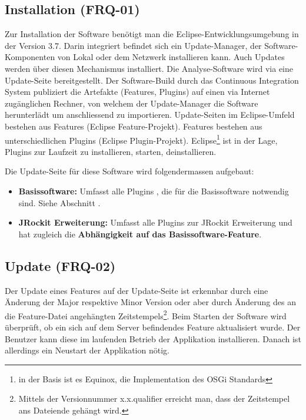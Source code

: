 \subsection{Installation (FRQ-01)}\label{installation}
Zur Installation der Software benötigt man die Eclipse-Entwicklungsumgebung in der Version 3.7. Darin integriert befindet sich ein Update-Manager, der Software-Komponenten von Lokal oder dem Netzwerk installieren kann. Auch Updates werden über diesen Mechanismus installiert. Die Analyse-Software wird via eine Update-Seite bereitgestellt. Der Software-Build durch das Continuous Integration System publiziert die Artefakte (Features, Plugins) auf einen via Internet zugänglichen Rechner, von welchem der Update-Manager die Software herunterlädt um anschliessend zu importieren. Update-Seiten im Eclipse-Umfeld bestehen aus Features (Eclipse Feature-Projekt). Features bestehen aus unterschiedlichen Plugins (Eclipse Plugin-Projekt). Eclipse\footnote{in der Basis ist es Equinox, die Implementation des OSGi Standards} ist in der Lage, Plugins zur Laufzeit zu installieren, starten, deinstallieren.

Die Update-Seite für diese Software wird folgendermassen aufgebaut:
\begin{itemize}
\item \textbf{Basissoftware:} Umfasst alle Plugins , die für die Basissoftware notwendig sind. Siehe Abschnitt .
\item \textbf{JRockit Erweiterung: }Umfasst alle Plugins zur JRockit Erweiterung und hat zugleich die \textbf{Abhängigkeit auf das Basissoftware-Feature}.
\end{itemize}

\subsection{Update (FRQ-02)}
Der Update eines Features auf der Update-Seite ist erkennbar durch eine Änderung der Major respektive Minor Version oder aber durch Änderung des an die Feature-Datei angehängten Zeitstempels\footnote{Mittels der Versionnummer x.x.qualifier erreicht man, dass der Zeitstempel ans Dateiende gehängt wird.}. Beim Starten der Software wird überprüft, ob ein sich auf dem Server befindendes Feature aktualisiert wurde. Der Benutzer kann diese im laufenden Betrieb der Applikation installieren. Danach ist allerdings ein Neustart der Applikation nötig. 

